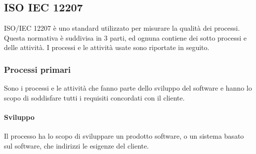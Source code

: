 \subsection{ISO IEC 12207}
ISO/IEC 12207 è uno standard utilizzato per misurare la qualità dei processi. Questa normativa è suddivisa in 3 parti,
ed ognuna contiene dei sotto processi e delle attività. I processi e le attività usate sono riportate in seguito. 

\subsubsection{Processi primari}
Sono i processi e le attività che fanno parte dello sviluppo del software e hanno lo scopo di soddisfare tutti i requisiti concordati con il cliente.

\paragraph{Sviluppo}
Il processo ha lo scopo di sviluppare un prodotto software, o un sistema basato sul software, che indirizzi le esigenze del cliente.
